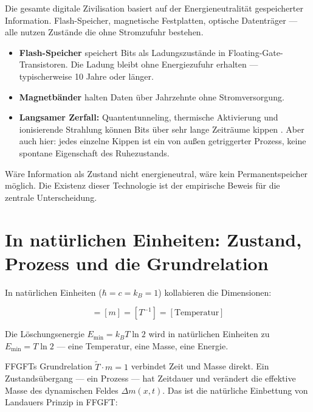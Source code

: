 Die gesamte digitale Zivilisation basiert auf der Energieneutralität
gespeicherter Information. Flash-Speicher, magnetische Festplatten,
optische Datenträger — alle nutzen Zustände die ohne Stromzufuhr bestehen.

\begin{itemize}
  \item \textbf{Flash-Speicher} speichert Bits als Ladungszustände in
        Floating-Gate-Transistoren. Die Ladung bleibt ohne Energiezufuhr
        erhalten — typischerweise 10 Jahre oder länger.
  \item \textbf{Magnetbänder} halten Daten über Jahrzehnte ohne
        Stromversorgung.
  \item \textbf{Langsamer Zerfall:} Quantentunneling, thermische
        Aktivierung und ionisierende Strahlung können Bits über sehr
        lange Zeiträume kippen \cite{Bez2003}. Aber auch hier: jedes
        einzelne Kippen ist ein von außen getriggerter Prozess, keine
        spontane Eigenschaft des Ruhezustands.
\end{itemize}

Wäre Information als Zustand nicht energieneutral, wäre kein Permanentspeicher
möglich. Die Existenz dieser Technologie ist der empirische Beweis für die
zentrale Unterscheidung.

\section{In natürlichen Einheiten: Zustand, Prozess und die Grundrelation}

In natürlichen Einheiten ($\hbar = c = k_B = 1$) kollabieren die
Dimensionen:

\begin{equation}
  [E] = [m] = [T^{-1}] = [\text{Temperatur}]
\end{equation}

Die Löschungsenergie $E_{\min} = k_B T \ln 2$ wird in natürlichen Einheiten
zu $E_{\min} = T \ln 2$ — eine Temperatur, eine Masse, eine Energie.

FFGFTs Grundrelation $\tilde{T} \cdot m = 1$ verbindet Zeit und Masse direkt.
Ein Zustandsübergang — ein Prozess — hat Zeitdauer und verändert die effektive
Masse des dynamischen Feldes $\Delta m(x,t)$. Das ist die natürliche Einbettung
von Landauers Prinzip in FFGFT:


